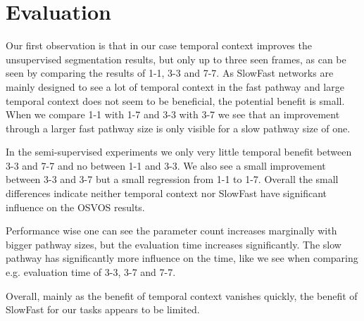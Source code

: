 \section{Evaluation}
Our first observation is that in our case temporal context improves the unsupervised segmentation results, but only up to three seen frames, as can be seen by comparing the results of 1-1, 3-3 and 7-7. As SlowFast networks are mainly designed to see a lot of temporal context in the fast pathway and large temporal context does not seem to be beneficial, the potential benefit is small. When we compare 1-1 with 1-7 and 3-3 with 3-7 we see that an improvement through a larger fast pathway size is only visible for a slow pathway size of one.

In the semi-supervised experiments we only very little temporal benefit between 3-3 and 7-7 and no between 1-1 and 3-3. We also see a small improvement between 3-3 and 3-7 but a small regression from 1-1 to 1-7. Overall the small differences indicate neither temporal context nor SlowFast have significant influence on the OSVOS results.

Performance wise one can see the parameter count increases marginally with bigger pathway sizes, but the evaluation time increases significantly. The slow pathway has significantly more influence on the time, like we see when comparing e.g. evaluation time of 3-3, 3-7 and 7-7.

Overall, mainly as the benefit of temporal context vanishes quickly, the benefit of SlowFast for our tasks appears to be limited. 